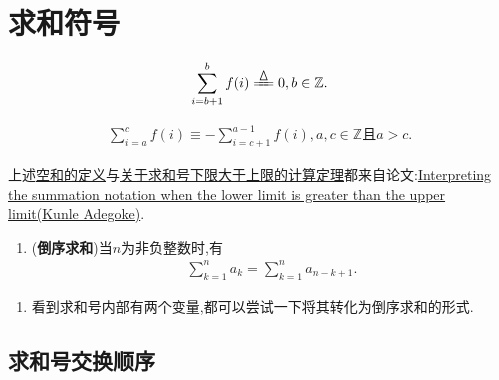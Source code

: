 \documentclass[../../main.tex]{subfiles}%
\begin{document}
\section{求和符号}

\begin{definition}\label{definition:空和(Empty sum)}
\begin{align}
\sum\limits_{i=b+1}^b{f(i)}\xlongequal{\bigtriangleup}0,b\in \mathbb{Z}.
\end{align}
\end{definition}

\begin{theorem}[关于求和号下限大于上限的计算]\label{theorem:关于求和号下限大于上限的计算}
\begin{align}
\sum\limits_{i=a}^c{f(i)}\equiv -\sum\limits_{i=c+1}^{a-1}{f(i),a,c}\in \mathbb{Z}\text{且} a>c. 
\end{align}
\end{theorem}
\begin{note}
上述\hyperref[definition:空和(Empty sum)]{空和的定义}与\hyperref[theorem:关于求和号下限大于上限的计算]{关于求和号下限大于上限的计算定理}都来自论文:\href{https://vixra.org/pdf/1601.0207v1.pdf}{Interpreting the summation notation when
the lower limit is greater than the upper limit(Kunle Adegoke)}.
\end{note}

\begin{theorem}[求和号基本性质]\label{theorem:求和号基本性质}
\begin{enumerate}
\item\label{theorem:求和号基本性质1} (\textbf{倒序求和})当$n$为非负整数时,有
\begin{align*}
\sum\limits_{k=1}^n{a_k}=\sum\limits_{k=1}^n{a_{n-k+1}}.
\end{align*}
\end{enumerate}
\end{theorem}
\begin{note}
\begin{enumerate}
\item 看到求和号内部有两个变量,都可以尝试一下将其转化为倒序求和的形式.
\end{enumerate}
\end{note}


\subsection{求和号交换顺序}
\end{document}
